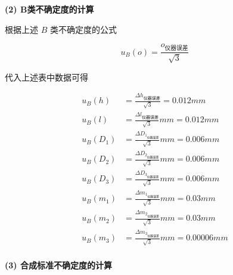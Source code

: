 \documentclass[UTF8]{ctexart}
\begin{document}
\begin{spacing}{1.35}
\textbf{(2) B类不确定度的计算}

根据上述 $B$ 类不确定度的公式 

$$u_B(o) = \frac{o_{\text{仪器误差}}}{\sqrt{3}}$$

代入上述表中数据可得
\end{spacing}


\begin{align*}
 u_{B}(h)  &= \frac{\Delta h_{\text{仪器误差}}}{\sqrt{3}}   = 0.012 mm\\
      u_B(l)  &= \frac{\Delta l_{\text{仪器误差}}}{\sqrt{3}} mm  = 0.012 mm\\
      u_B(D_1) &= \frac{\Delta D_{1_{{\text{仪器误差}}}}}{\sqrt{3}} mm=  0.006 mm\\
      u_B(D_2) &= \frac{\Delta D_{2_{{\text{仪器误差}}}}}{\sqrt{3}}mm =0.006 mm \\
      u_B(D_3) &= \frac{\Delta D_{3_{{\text{仪器误差}}}}}{\sqrt{3}} mm= 0.006 mm\\
      u_B(m_1) & = \frac{\Delta m_{1_{{\text{仪器误差}}}}}{\sqrt{3}} mm = 0.03mm\\
      u_B(m_2) & =\frac{\Delta m_{2_{{\text{仪器误差}}}}}{\sqrt{3}} mm = 0.03 mm\\
      u_B(m_3) & =\frac{\Delta m_{3_{{\text{仪器误差}}}}}{\sqrt{3}} mm= 0.00006 mm
      \\
\end{align*}

\textbf{(3) 合成标准不确定度的计算}
\end{document}
